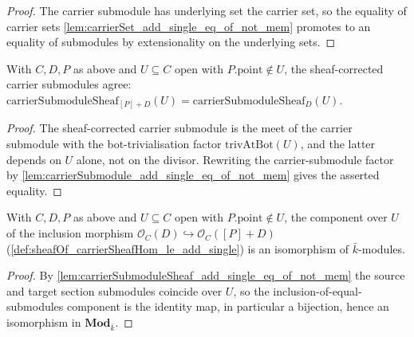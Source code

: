 \begin{proof}
  The carrier submodule has underlying set the carrier set, so the equality of
  carrier sets \cref{lem:carrierSet_add_single_eq_of_not_mem} promotes to an
  equality of submodules by extensionality on the underlying sets.
\end{proof}

\begin{lemma}

  \label{lem:carrierSubmoduleSheaf_add_single_eq_of_not_mem}
  With \(C, D, P\) as above and \(U \subseteq C\) open with
  \(P.\mathrm{point} \notin U\), the sheaf-corrected carrier submodules agree:
  \(\mathrm{carrierSubmoduleSheaf}_{[P]+D}(U) =
  \mathrm{carrierSubmoduleSheaf}_D(U)\).
\end{lemma}

\begin{proof}
  The sheaf-corrected carrier submodule is the meet of the carrier submodule
  with the bot-trivialisation factor \(\mathrm{trivAtBot}(U)\), and the latter
  depends on \(U\) alone, not on the divisor. Rewriting the carrier-submodule
  factor by \cref{lem:carrierSubmodule_add_single_eq_of_not_mem} gives the
  asserted equality.
\end{proof}

\begin{lemma}
  \label{lem:carrierPresheaf_le_hom_app_isIso_of_not_mem}
  With \(C, D, P\) as above and \(U \subseteq C\) open with
  \(P.\mathrm{point} \notin U\), the component over \(U\) of the inclusion
  morphism \(\mathcal O_C(D) \hookrightarrow \mathcal O_C([P]+D)\)
  (\cref{def:sheafOf_carrierSheafHom_le_add_single}) is an isomorphism of
  \(\bar k\)-modules.
\end{lemma}

\begin{proof}
  By \cref{lem:carrierSubmoduleSheaf_add_single_eq_of_not_mem} the source and
  target section submodules coincide over \(U\), so the
  inclusion-of-equal-submodules component is the identity map, in particular a
  bijection, hence an isomorphism in \(\mathbf{Mod}_{\bar k}\).
\end{proof}

